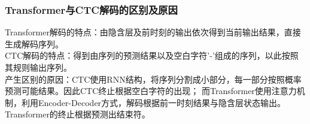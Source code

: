 \documentclass[a4paper]{article}
\begin{document}
\subsubsection{Transformer与CTC解码的区别及原因}
Transformer解码的特点：由隐含层及前时刻的输出依次得到当前输出结果，直接生成解码序列。\\
CTC解码的特点：得到由序列的预测结果以及空白字符'-'组成的序列，以此按照其规则输出序列。\\
产生区别的原因：CTC使用RNN结构，将序列分割成小部分，每一部分按照概率预测可能结果。因此CTC终止根据空白字符的出现；
而Transformer使用注意力机制，利用Encoder-Decoder方式，解码根据前一时刻结果与隐含层状态输出。Transformer的终止根据预测出结束符。\\



\end{document}

